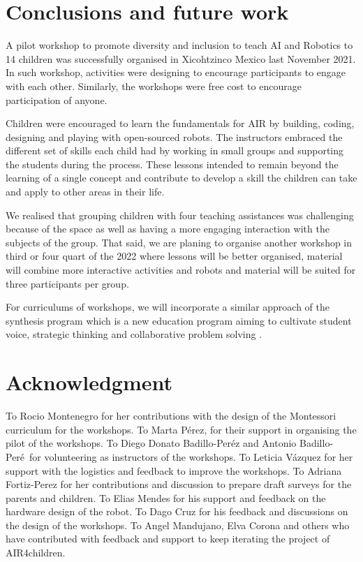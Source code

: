 \documentclass[conference]{IEEEtran}
\begin{document}
\section{Conclusions and future work}
A pilot workshop to promote diversity and inclusion to teach AI and Robotics to 14 children was successfully organised in Xicohtzinco Mexico last November 2021.
In such workshop, activities were designing to encourage participants to engage with each other. 
Similarly, the workshops were free cost to encourage participation of anyone. 

Children were encouraged to learn the fundamentals for AIR by building, coding, designing and playing with open-sourced robots. The instructors embraced the different set of skills each child had by working in small groups and supporting the students during the process. These lessons intended to remain beyond the learning of a single concept and contribute to develop a skill the children can take and apply to other areas in their life.


We realised that grouping children with four teaching assistances was challenging because of the space as well as having a more engaging interaction with the subjects of the group. 
That said, we are planing to organise another workshop in third or four quart of the 2022 where lessons will be better organised, material will combine more interactive activities and robots and material will be suited for three participants per group. 

For curriculums of workshops, we will incorporate a similar approach of the synthesis program which is a new education program aiming to cultivate student voice, strategic thinking and collaborative problem solving \cite{synthesis2022}.


\section*{Acknowledgment}
To Rocio Montenegro for her contributions with the design of the Montessori curriculum for the workshops.
To Marta P\'erez, for their support in organising the pilot of the workshops.
To Diego Donato Badillo-Per\'ez and Antonio Badillo-Per\'e\ for volunteering as instructors of the workshops.
To Leticia V\'azquez for her support with the logistics and feedback to improve the workshops.
To Adriana Fortiz-Perez for her contributions and discussion to prepare draft surveys for the parents and children. 
To Elias Mendes for his support and feedback on the hardware design of the robot.
To Dago Cruz for his feedback and discussions on the design of the workshops.
To Angel Mandujano, Elva Corona and others who have contributed with feedback and support to keep iterating the project of AIR4children. 



\end{document}
